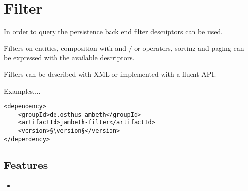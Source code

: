 \section{Filter}
\label{module:Filter}
\ClearAPI
In order to query the persistence back end filter descriptors can be used. 

Filters on entities, composition with and / or operators, sorting and paging can be expressed with the available descriptors.

Filters can be described with XML or implemented with a fluent API.

\TODO Examples....

\begin{lstlisting}[style=POM,caption={Maven modules to use \emph{Ambeth Filter}}]
<dependency>
	<groupId>de.osthus.ambeth</groupId>
	<artifactId>jambeth-filter</artifactId>
	<version>§\version§</version>
</dependency>
\end{lstlisting}
\subsection{Features}
\begin{itemize}
	\item \TODO
\end{itemize}


